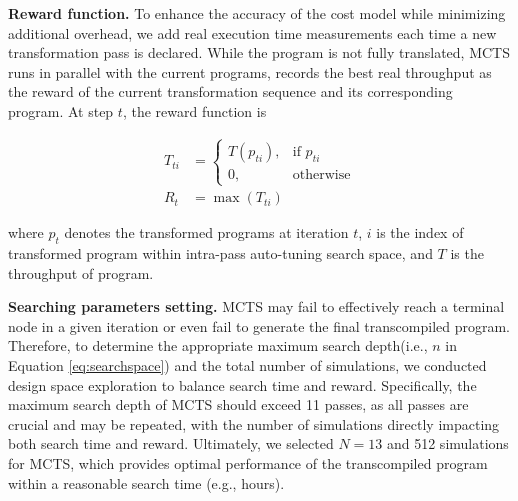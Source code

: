 \textbf{Reward function.} To enhance the accuracy of the cost model while minimizing additional overhead, we add real execution time measurements each time a new transformation pass is declared. While the program is not fully translated, MCTS runs in parallel with the current programs, records the best real throughput as the reward of the current transformation sequence and its corresponding program.
At step $t$, the reward function is


\vspace{-10pt}

\footnotesize
\begin{align}
T_{ti} &=
\begin{cases}
    T(p_{ti}), & \text{if } p_{ti} \\[5pt]
    0, & \text{otherwise}
\end{cases} \\
R_{t} &= \max(T_{ti})
\end{align}
\vspace{-10pt}
\normalsize



where $p_{t}$ denotes the transformed programs at iteration $t$, $i$ is the index of transformed program within intra-pass auto-tuning search space, and $T$ is the throughput of program. 

\textbf{Searching parameters setting.}
MCTS may fail to effectively reach a terminal node in a given iteration or even fail to generate the final transcompiled program. Therefore, to determine the appropriate maximum search depth(i.e., $n$ in Equation \ref{eq:searchspace}) and the total number of simulations, we conducted design space exploration to balance search time and reward. Specifically, the maximum search depth of MCTS should exceed 11 passes, as all passes are crucial and may be repeated, with the number of simulations directly impacting both search time and reward. Ultimately, we selected $N=13$ and 512 simulations for MCTS, which provides optimal performance of the transcompiled program within a reasonable search time (e.g., hours).
\vspace{-5pt}

